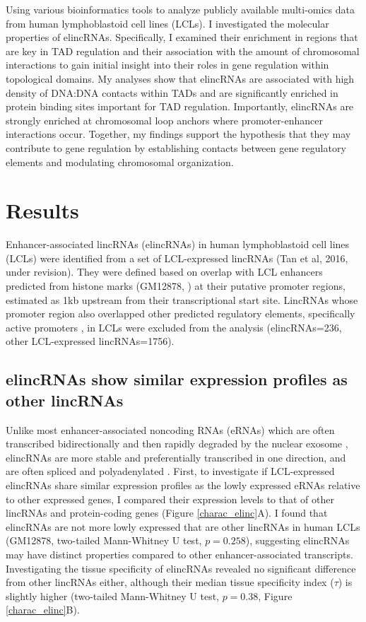 \documentclass[11pt,a4paper]{report}
\begin{document}
Using various bioinformatics tools to analyze publicly available multi-omics data from human lymphoblastoid cell lines (LCLs). I investigated the molecular properties of elincRNAs. Specifically, I examined their enrichment in regions that are key in TAD regulation and their association with the amount of chromosomal interactions to gain initial insight into their roles in gene regulation within topological domains. My analyses show that elincRNAs are associated with high density of DNA:DNA contacts within TADs and are significantly enriched in protein binding sites important for TAD regulation. Importantly, elincRNAs are strongly enriched at chromosomal loop anchors where promoter-enhancer interactions occur. Together, my findings support the hypothesis that they may contribute to gene regulation by establishing contacts between gene regulatory elements and modulating chromosomal organization.

\section*{Results}

Enhancer-associated lincRNAs (elincRNAs) in human lymphoblastoid cell lines (LCLs) were identified from a set of LCL-expressed lincRNAs (Tan et al, 2016, under revision). They were defined based on overlap with LCL enhancers predicted from histone marks (GM12878, \cite{ENCODEProject2012}⁠) at their putative promoter regions, estimated as 1kb upstream from their transcriptional start site. LincRNAs whose promoter region also overlapped other predicted regulatory elements, specifically active promoters \cite{ENCODEProject2012}⁠, in LCLs were excluded from the analysis (elincRNAs=236, other LCL-expressed lincRNAs=1756).

\subsection*{elincRNAs show similar expression profiles as other lincRNAs}

Unlike most enhancer-associated noncoding RNAs (eRNAs) which are often transcribed bidirectionally and then rapidly degraded by the nuclear exosome \cite{Darrow2013} \cite{Lam2014}⁠, elincRNAs are more stable and preferentially transcribed in one direction, and are often spliced and polyadenylated \cite{Marques2013a}⁠. 
First, to investigate if LCL-expressed elincRNAs share similar expression profiles as the lowly expressed eRNAs relative to other expressed genes, I compared  their expression levels to that of other lincRNAs and protein-coding genes (Figure \ref{charac_elinc}A). I found that elincRNAs are not more lowly expressed that are other lincRNAs in human LCLs (GM12878, two-tailed Mann-Whitney U test, $p=0.258$), suggesting elincRNAs may have distinct properties compared to other enhancer-associated transcripts. Investigating the tissue specificity of elincRNAs revealed no significant difference from other lincRNAs either, although their median tissue specificity index ($\tau$) is slightly higher (two-tailed Mann-Whitney U test, $p=0.38$, Figure \ref{charac_elinc}B).
\end{document}
